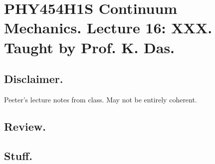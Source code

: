 
%

\chapter{PHY454H1S Continuum Mechanics.  Lecture 16: XXX.  Taught by Prof. K. Das.}
\label{chap:continuumL16}
{}
\date{Mar 14, 2012}

\beginArtWithToc

\section{Disclaimer.}

Peeter's lecture notes from class.  May not be entirely coherent.

\section{Review.}

\section{Stuff.}


\EndNoBibArticle
